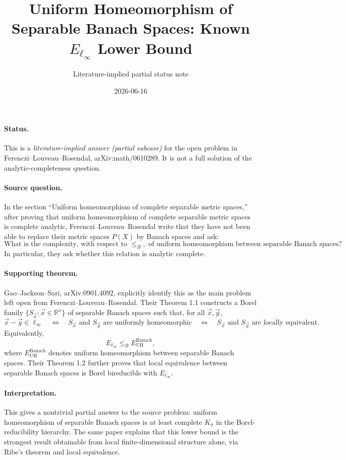 \documentclass[11pt]{article}
\title{Uniform Homeomorphism of Separable Banach Spaces: Known \texorpdfstring{$E_{\ell_\infty}$}{E ell-infinity} Lower Bound}
\author{Literature-implied partial status note}
\date{2026-06-16}
\begin{document}
\maketitle

\paragraph{Status.}
This is a \emph{literature-implied answer (partial subcase)} for the open problem in Ferenczi--Louveau--Rosendal, arXiv:math/0610289.  It is not a full solution of the analytic-completeness question.

\paragraph{Source question.}
In the section ``Uniform homeomorphism of complete separable metric spaces,'' after proving that uniform homeomorphism of complete separable metric spaces is complete analytic, Ferenczi--Louveau--Rosendal write that they have not been able to replace their metric spaces \(P(X)\) by Banach spaces and ask:
\[
\text{What is the complexity, with respect to }\leq_B,\text{ of uniform homeomorphism between separable Banach spaces?}
\]
In particular, they ask whether this relation is analytic complete.

\paragraph{Supporting theorem.}
Gao--Jackson--Sari, arXiv:0901.4092, explicitly identify this as the main problem left open from Ferenczi--Louveau--Rosendal.  Their Theorem 1.1 constructs a Borel family \(\{S_{\vec x}:\vec x\in\mathbb R^\omega\}\) of separable Banach spaces such that, for all \(\vec x,\vec y\),
\[
\vec x-\vec y\in \ell_\infty
\quad\Longleftrightarrow\quad
S_{\vec x}\text{ and }S_{\vec y}\text{ are uniformly homeomorphic}
\quad\Longleftrightarrow\quad
S_{\vec x}\text{ and }S_{\vec y}\text{ are locally equivalent}.
\]
Equivalently,
\[
E_{\ell_\infty}\leq_B E_{\mathrm{UH}}^{\mathrm{Banach}},
\]
where \(E_{\mathrm{UH}}^{\mathrm{Banach}}\) denotes uniform homeomorphism between separable Banach spaces.  Their Theorem 1.2 further proves that local equivalence between separable Banach spaces is Borel bireducible with \(E_{\ell_\infty}\).

\paragraph{Interpretation.}
This gives a nontrivial partial answer to the source problem: uniform homeomorphism of separable Banach spaces is at least complete \(K_\sigma\) in the Borel-reducibility hierarchy.  The same paper explains that this lower bound is the strongest result obtainable from local finite-dimensional structure alone, via Ribe's theorem and local equivalence.
\end{document}

